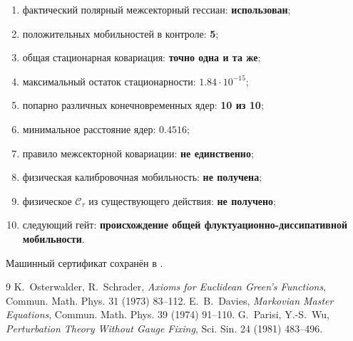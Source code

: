 \begin{protocol}
\begin{enumerate}
 \item фактический полярный межсекторный гессиан: \textbf{использован};
 \item положительных мобильностей в контроле: \textbf{5};
 \item общая стационарная ковариация: \textbf{точно одна и та же};
 \item максимальный остаток стационарности: \textbf{$1.84\cdot10^{-15}$};
 \item попарно различных конечновременных ядер: \textbf{10 из 10};
 \item минимальное расстояние ядер: \textbf{$0.4516$};
 \item правило межсекторной ковариации: \textbf{не единственно};
 \item физическая калибровочная мобильность: \textbf{не получена};
 \item физическое $\mathcal C_\tau$ из существующего действия:
 \textbf{не получено};
 \item следующий гейт: \textbf{происхождение общей
 флуктуационно-диссипативной мобильности}.
\end{enumerate}
\end{protocol}

Машинный сертификат сохранён в
.

\begin{thebibliography}{9}
K.~Osterwalder, R.~Schrader,
\emph{Axioms for Euclidean Green's Functions},
Commun. Math. Phys. 31 (1973) 83--112.
E.~B.~Davies,
\emph{Markovian Master Equations},
Commun. Math. Phys. 39 (1974) 91--110.
G.~Parisi, Y.-S.~Wu,
\emph{Perturbation Theory Without Gauge Fixing},
Sci. Sin. 24 (1981) 483--496.
\end{thebibliography}